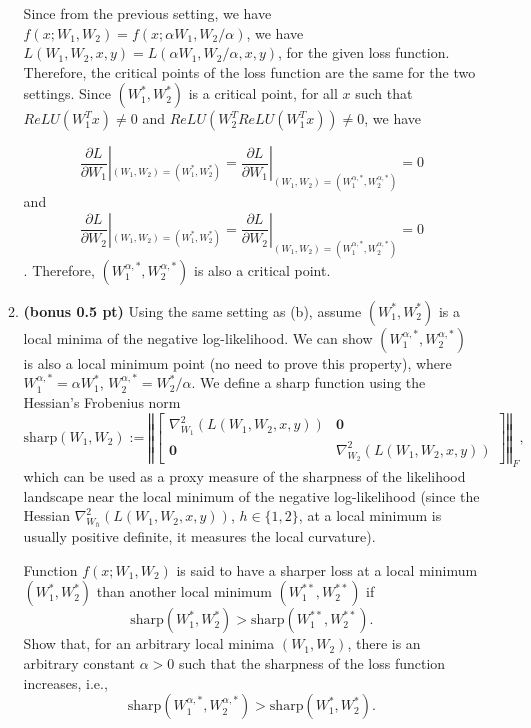 \begin{enumerate}
\begin{enumerate}
  Since from the previous setting, we have $f(x; W_1, W_2) = f(x; \alpha W_1,
  W_2/\alpha)$, we have $L(W_1, W_2, x, y) = L(\alpha W_1, W_2/\alpha, x, y)$,
  for the given loss function. Therefore, the critical points of the loss
  function are the same for the two settings. Since $(W^*_1, W^*_2)$ is a
  critical point, for all $x$ such that $ReLU(W_1^T x) \neq 0$ and $ReLU(W_2^T
  ReLU(W_1^T x)) \neq 0$, we have 
  
  $$\frac{\partial L}{\partial W_1}|_{(W_1,W_2) = (W^*_1,W^*_2)} =
  \frac{\partial L}{\partial W_1}|_{(W_1,W_2) = (W^{\alpha,*}_1,W^{\alpha,*}_2)}
  = 0$$ and $$\frac{\partial L}{\partial W_2}|_{(W_1,W_2) = (W^*_1,W^*_2)} =
  \frac{\partial L}{\partial W_2}|_{(W_1,W_2) = (W^{\alpha,*}_1,W^{\alpha,*}_2)}
  = 0$$. Therefore, $(W^{\alpha,*}_1, W^{\alpha,*}_2)$ is also a critical point.
  
    \newpage
    
    \item {\bf (bonus 0.5 pt)}
    Using the same setting as (b), assume $(W_1^*,W_2^*)$ is a local minima of the negative log-likelihood. We can show $(W_1^{\alpha,*},W_2^{\alpha,*})$ is also a local minimum point (no need to prove this property), where $W^{\alpha,*}_1=\alpha W^*_1$, $W^{\alpha,*}_2=W^*_2/\alpha$. We define a sharp function using the Hessian's Frobenius norm $$\text{sharp}(W_1,W_2) := \left\Vert \begin{bmatrix} \nabla^2_{W_1}(L(W_1,W_2,x,y))  & \mathbf{0}\\
    \mathbf{0} & \nabla^2_{W_2}(L(W_1,W_2,x,y))
    \end{bmatrix}\right\Vert_F,$$ which can be used as a proxy measure of the sharpness of the likelihood landscape near the local minimum of the negative log-likelihood (since the Hessian $\nabla^2_{W_h}(L(W_1,W_2,x,y))$, $h \in \{1,2\}$, at a local minimum is usually positive definite, it measures the local curvature).

    Function $f(x;W_1,W_2)$ is said to have a sharper loss at a local minimum $(W_1^*,W_2^*)$ than another local minimum $(W_1^{**},W_2^{**})$ if 
    $$\text{sharp}(W^*_1,W^*_2) > \text{sharp}(W^{**}_1,W^{**}_2).$$
    Show that, for an arbitrary local minima $(W_1,W_2)$, there is an arbitrary constant $\alpha > 0$ such that the sharpness of the loss function increases, i.e., $$\text{sharp}(W^{\alpha,*}_1,W^{\alpha,*}_2) > \text{sharp}(W^{*}_1,W^{*}_2).$$


\end{enumerate}
\end{enumerate}
